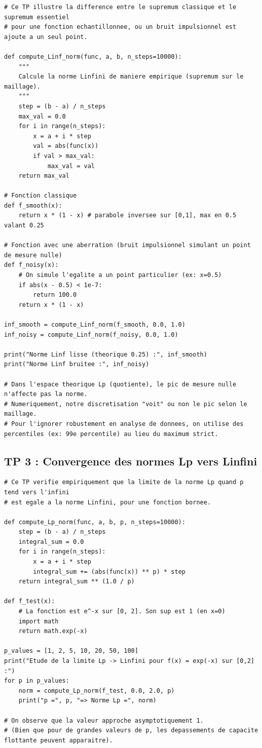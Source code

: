 \documentclass[11pt,a4paper]{article}
\begin{document}
\begin{lstlisting}
# Ce TP illustre la difference entre le supremum classique et le supremum essentiel
# pour une fonction echantillonnee, ou un bruit impulsionnel est ajoute a un seul point.

def compute_Linf_norm(func, a, b, n_steps=10000):
    """
    Calcule la norme Linfini de maniere empirique (supremum sur le maillage).
    """
    step = (b - a) / n_steps
    max_val = 0.0
    for i in range(n_steps):
        x = a + i * step
        val = abs(func(x))
        if val > max_val:
            max_val = val
    return max_val

# Fonction classique
def f_smooth(x):
    return x * (1 - x) # parabole inversee sur [0,1], max en 0.5 valant 0.25

# Fonction avec une aberration (bruit impulsionnel simulant un point de mesure nulle)
def f_noisy(x):
    # On simule l'egalite a un point particulier (ex: x=0.5)
    if abs(x - 0.5) < 1e-7:
        return 100.0
    return x * (1 - x)

inf_smooth = compute_Linf_norm(f_smooth, 0.0, 1.0)
inf_noisy = compute_Linf_norm(f_noisy, 0.0, 1.0)

print("Norme Linf lisse (theorique 0.25) :", inf_smooth)
print("Norme Linf bruitee :", inf_noisy)

# Dans l'espace theorique Lp (quotiente), le pic de mesure nulle n'affecte pas la norme.
# Numeriquement, notre discretisation "voit" ou non le pic selon le maillage.
# Pour l'ignorer robustement en analyse de donnees, on utilise des percentiles (ex: 99e percentile) au lieu du maximum strict.\end{lstlisting}


\subsection*{TP 3 : Convergence des normes Lp vers Linfini}

\begin{lstlisting}
# Ce TP verifie empiriquement que la limite de la norme Lp quand p tend vers l'infini
# est egale a la norme Linfini, pour une fonction bornee.

def compute_Lp_norm(func, a, b, p, n_steps=10000):
    step = (b - a) / n_steps
    integral_sum = 0.0
    for i in range(n_steps):
        x = a + i * step
        integral_sum += (abs(func(x)) ** p) * step
    return integral_sum ** (1.0 / p)

def f_test(x):
    # La fonction est e^-x sur [0, 2]. Son sup est 1 (en x=0)
    import math
    return math.exp(-x)

p_values = [1, 2, 5, 10, 20, 50, 100]
print("Etude de la limite Lp -> Linfini pour f(x) = exp(-x) sur [0,2] :")
for p in p_values:
    norm = compute_Lp_norm(f_test, 0.0, 2.0, p)
    print("p =", p, "=> Norme Lp =", norm)

# On observe que la valeur approche asymptotiquement 1.
# (Bien que pour de grandes valeurs de p, les depassements de capacite flottante peuvent apparaitre).\end{lstlisting}
\end{document}
